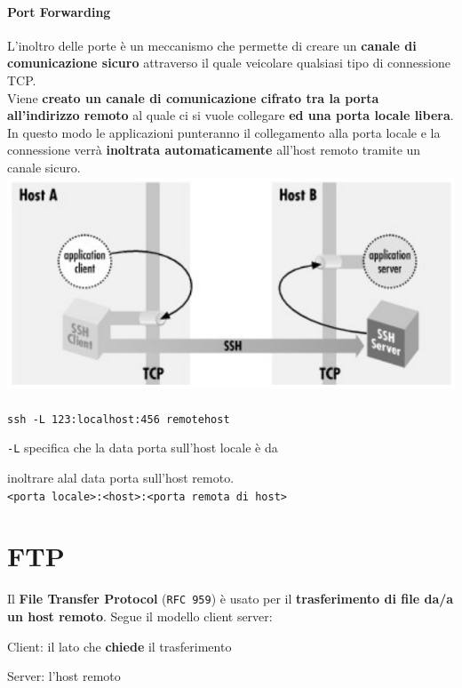 \documentclass[10pt]{article}
\begin{document}
\paragraph{Port Forwarding} L'inoltro delle porte è un meccanismo che permette di creare un \textbf{canale di comunicazione sicuro} attraverso il quale veicolare qualsiasi tipo di connessione TCP.\\
Viene \textbf{creato un canale di comunicazione cifrato tra la porta all'indirizzo remoto} al quale ci si vuole collegare \textbf{ed una porta locale libera}. In questo modo le applicazioni punteranno il collegamento alla porta locale e la connessione verrà \textbf{inoltrata automaticamente} all'host remoto tramite un canale sicuro.\\
\includegraphics[scale=0.75]{portforwarding.png}\\\\
\texttt{ssh -L 123:localhost:456 remotehost}

\texttt{-L} specifica che la data porta sull'host locale è da 

inoltrare alal data porta sull'host remoto.\\

\texttt{<porta locale>:<host>:<porta remota di host>}
\pagebreak
\section{FTP}
Il \textbf{File Transfer Protocol} (\texttt{RFC 959}) è usato per il \textbf{trasferimento di file da/a un host remoto}. Segue il modello client server:
\begin{list}{}{}
\item Client: il lato che \textbf{chiede} il trasferimento
\item Server: l'host remoto
\end{list}
\end{document}
